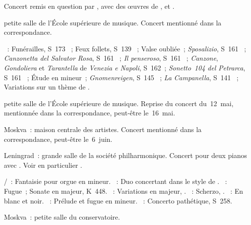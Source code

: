 \begin{description}
 Concert remis en question par \Vizel{}, avec des œuvres de \Schumann{},
 \Brahms{} et \Chopin{}.
 \item[\DateWithWeekDay{1932-05-12}]
 petite salle de l'\hbox{École} supérieure de musique.
 Concert mentionné dans la correspondance.

 \textsc{\Liszt{}}~: Funérailles, S~173 ~; Feux follets, S~139
 ~; Valse oubliée~; \emph{Sposalizio}, S~161 ~;
 \emph{Canzonetta del Salvator Rosa}, S~161 ~; \emph{Il
 penseroso}, S~161 ~; \emph{Canzone}, \emph{Gondoliera} et
 \emph{Tarantella} de \emph{Venezia e Napoli}, S~162~; \emph{Sonetto~104
 del Petrarca}, S~161 ~; Étude en \kF mineur~;
 \emph{Gnomenreigen}, S~145 ~; \emph{La Campanella}, S~141
 ~; Variations sur un thème de \Paganini{}.
 \item[\DateWithWeekDay{1932-05-14}]
 petite salle de l'\hbox{École} supérieure de musique.
 Reprise du concert du~12~mai, mentionnée dans la correspondance, peut-être
 le~16~mai.
 \item[\DateWithWeekDay{1932-06-05}]
 Moskva~: maison centrale des artistes.
 Concert mentionné dans la correspondance, peut-être le~6~juin.
 \item[\DateWithWeekDay{1932-06-09}]
 Leningrad~: grande salle de la société philharmonique.
 Concert pour deux pianos avec \LOborine{}.
 Voir en particulier \citet[p.~437]{Milshteyn82a}.

 \textsc{\Mozart{}/\Busoni{}}~: Fantaisie pour orgue en \kF mineur.
 \textsc{\Busoni{}}~: Duo concertant dans le style de \Mozart{}.
 \textsc{\Mozart{}}~: Fugue~; Sonate en \kD majeur, K~448.
 \textsc{\Schumann{}}~: Variations en \kB \Flat majeur, .
 \textsc{\SaintSaens{}}~: Scherzo, .
 \textsc{\Debussy{}}~: En blanc et noir.
 \textsc{\Taneiev{}}~: Prélude et fugue en \kG \Sharp mineur.
 \textsc{\Liszt{}}~: Concerto pathétique, S~258.
 \item[\DateWithWeekDay{1932-06-24}]
 Moskva~: petite salle du conservatoire.


\end{description}
